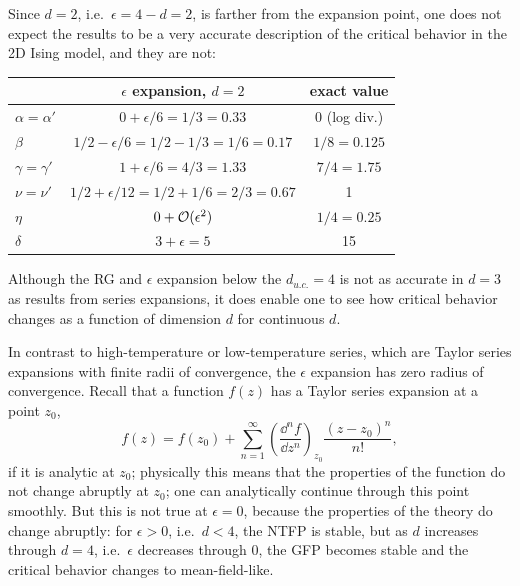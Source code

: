 Since $d = 2$, i.e.\ $\epsilon = 4-d = 2$, is farther from the expansion point, one does not expect the results
to be a very accurate description of the critical behavior in the 2D Ising model, and they are not:
\begin{center}
\renewcommand{\arraystretch}{1.2}
\begin{tabular}{lcc}
  & $\epsilon$ expansion, $d = 2$ & exact value\\ \hline
  $\alpha = \alpha'$ & $0+\epsilon/6 = 1/3 = 0.33$ & 0 (log div.)\\
  $\beta$ & $1/2-\epsilon/6 = 1/2-1/3 = 1/6 = 0.17$ & $1/8 = 0.125$\\
  $\gamma = \gamma'$ & $1+\epsilon/6 = 4/3 = 1.33$ & $7/4 = 1.75$\\
  $\nu = \nu'$ & $1/2+\epsilon/12 = 1/2+1/6 = 2/3 = 0.67$ & 1\\
  $\eta$ & $0+\mathcal{O}(\epsilon^2)$ & $1/4 = 0.25$\\
  $\delta$ & $3+\epsilon = 5$ & 15
\end{tabular}
\end{center}
Although the RG and $\epsilon$ expansion below the $d_{u.c.} = 4$ is not as accurate in $d = 3$ as results from
series expansions, it does enable one to see how critical behavior changes as a function of dimension $d$ for
continuous $d$.

In contrast to high-temperature or low-temperature series, which are Taylor series expansions with finite radii
of convergence, the $\epsilon$ expansion has zero radius of convergence. Recall that a function $f(z)$ has a
Taylor series expansion at a point $z_0$,
\begin{equation}
  f(z) = f(z_0) + \sum_{n=1}^\infty\left(\frac{\dd^nf}{\dd z^n}\right)_{z_0}\frac{(z-z_0)^n}{n!},
\end{equation}
if it is analytic at $z_0$; physically this means that the properties of the function do not change abruptly at
$z_0$; one can analytically continue through this point smoothly. But this is not true at $\epsilon = 0$, because
the properties of the theory do change abruptly: for $\epsilon>0$, i.e.\ $d<4$, the NTFP is stable, but as $d$
increases through $d = 4$, i.e.\ $\epsilon$ decreases through 0, the GFP becomes stable and the critical behavior
changes to mean-field-like.

